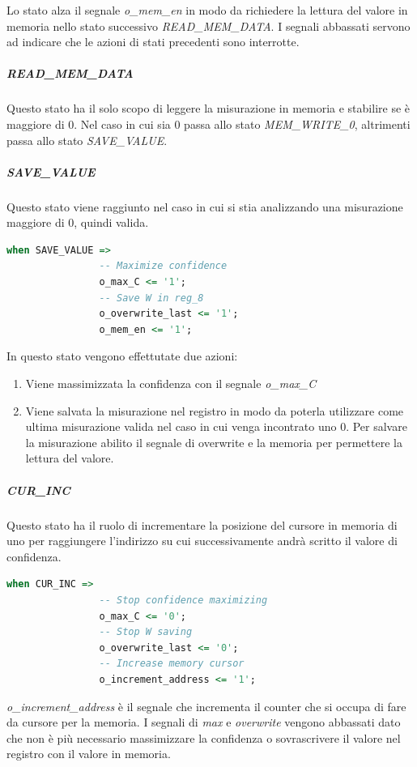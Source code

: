 \documentclass[12pt,a4paper]{scrartcl}
\begin{document}
                Lo stato alza il segnale \textit{o\_mem\_en} in modo da richiedere la lettura del valore in memoria nello stato successivo \textit{READ\_MEM\_DATA}. I segnali abbassati servono ad indicare che le azioni di stati precedenti sono interrotte.
            \subparagraph{READ\_MEM\_DATA}
                Questo stato ha il solo scopo di leggere la misurazione in memoria e stabilire se è maggiore di 0. Nel caso in cui sia 0 passa allo stato \textit{MEM\_WRITE\_0}, altrimenti passa allo stato \textit{SAVE\_VALUE}.
            \subparagraph{SAVE\_VALUE}
                Questo stato viene raggiunto nel caso in cui si stia analizzando una misurazione maggiore di 0, quindi valida.
                \begin{lstlisting}[language=VHDL]
            when SAVE_VALUE =>
                -- Maximize confidence
                o_max_C <= '1';
                -- Save W in reg_8
                o_overwrite_last <= '1';
                o_mem_en <= '1';
                 \end{lstlisting}
                 In questo stato vengono effettutate due azioni:
                    \begin{enumerate}
                        \item Viene massimizzata la confidenza con il segnale \textit{o\_max\_C}
                        \item Viene salvata la misurazione nel registro in modo da poterla utilizzare come ultima misurazione valida nel caso in cui venga incontrato uno 0. Per salvare la misurazione abilito il segnale di overwrite e la memoria per permettere la lettura del valore.
                    \end{enumerate}
                \subparagraph{CUR\_INC} Questo stato ha il ruolo di incrementare la posizione del cursore in memoria di uno per raggiungere l'indirizzo su cui successivamente andrà scritto il valore di confidenza.
                \begin{lstlisting}[language=VHDL]
            when CUR_INC =>
                -- Stop confidence maximizing
                o_max_C <= '0';
                -- Stop W saving
                o_overwrite_last <= '0';
                -- Increase memory cursor
                o_increment_address <= '1';
                 \end{lstlisting}
                 \textit{o\_increment\_address} è il segnale che incrementa il counter che si occupa di fare da cursore per la memoria.
                 \newline I segnali di \textit{max} e \textit{overwrite} vengono abbassati dato che non è più necessario massimizzare la confidenza o sovrascrivere il valore nel registro con il valore in memoria.
\end{document}
